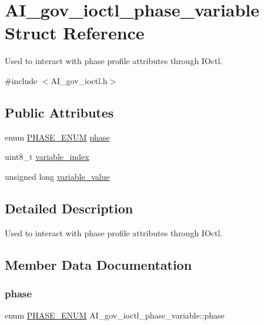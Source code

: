 \hypertarget{structAI__gov__ioctl__phase__variable}{}\section{A\+I\+\_\+gov\+\_\+ioctl\+\_\+phase\+\_\+variable Struct Reference}
\label{structAI__gov__ioctl__phase__variable}


Used to interact with phase profile attributes through I\+Octl.  




{\ttfamily \#include $<$A\+I\+\_\+gov\+\_\+ioctl.\+h$>$}

\subsection*{Public Attributes}
\begin{DoxyCompactItemize}
\item 
enum \hyperlink{AI__gov__phases_8h_a59664fef4d2987410ea13b917756d6ac}{P\+H\+A\+S\+E\+\_\+\+E\+N\+UM} \hyperlink{structAI__gov__ioctl__phase__variable_a3c40338c439b69650dbcde778f36a874}{phase}
\item 
uint8\+\_\+t \hyperlink{structAI__gov__ioctl__phase__variable_a126c0069e00ca72b7b9ec758c702df2b}{variable\+\_\+index}
\item 
unsigned long \hyperlink{structAI__gov__ioctl__phase__variable_a6414166476d3b31d73f08c744cbfbf78}{variable\+\_\+value}
\end{DoxyCompactItemize}


\subsection{Detailed Description}
Used to interact with phase profile attributes through I\+Octl. 

\subsection{Member Data Documentation}
\mbox{\label{structAI__gov__ioctl__phase__variable_a3c40338c439b69650dbcde778f36a874}} 
\subsubsection{\texorpdfstring{phase}{phase}}
{\footnotesize\ttfamily enum \hyperlink{AI__gov__phases_8h_a59664fef4d2987410ea13b917756d6ac}{P\+H\+A\+S\+E\+\_\+\+E\+N\+UM} A\+I\+\_\+gov\+\_\+ioctl\+\_\+phase\+\_\+variable\+::phase}

